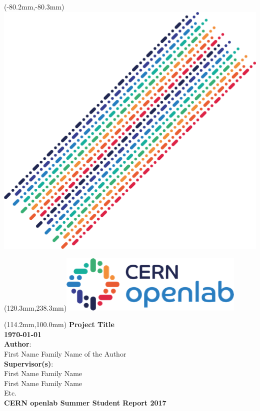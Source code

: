 \documentclass[12pt, letterpaper]{article}            %
\begin{document}
\begin{textblock*}{0mm}(-80.2mm,-80.3mm)\noindent \includegraphics*{./gfx/bg.png}\end{textblock*}
\begin{textblock*}{0mm}(120.3mm,238.3mm)\noindent \includegraphics*{./gfx/openlab.png}\end{textblock*}
\begin{textblock*}{150mm}(114.2mm,100.0mm)\noindent
{\bfseries\sffamily\textbf{\fontsize{20}{20}\selectfont\color{natc}Project Title}}\\[36pt]
{\bfseries\sffamily\textbf{\fontsize{16}{20}\selectfont\color{headc}\motd\today}}\\[24pt]
{\sffamily\fontsize{14}{20}\selectfont\color{subc}\textbf{Author}:}\\[5pt]
{\sffamily\fontsize{14}{20}\selectfont\color{subc}First Name Family Name of the Author }\\[18pt]
{\sffamily\fontsize{14}{20}\selectfont\color{subc}\textbf{Supervisor(s)}:}\\[5pt]
{\sffamily\fontsize{14}{20}\selectfont\color{subc}First Name Family Name}\\
{\sffamily\fontsize{14}{20}\selectfont\color{subc}First Name Family Name}\\
{\sffamily\fontsize{14}{20}\selectfont\color{subc}Etc.}
\\[18pt]
\textbf{\bfseries\sffamily\fontsize{11}{20}\selectfont\color{subc}CERN openlab Summer Student Report 2017}

\end{textblock*}
\end{document}
